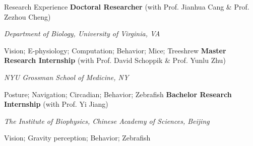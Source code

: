 \begin{rubric}{Research Experience}
\entry*[2025 - Present]%
    \textbf{Doctoral Researcher} (with Prof. Jianhua Cang \& Prof. Zezhou Cheng)\par
    \textit{Department of Biology, University of Virginia, VA}\par
    \textcolor{SwishLineColour}{Vision; E-physiology; Computation; Behavior; Mice; Treeshrew}
%
\entry*[2023 - 2025]%
    \textbf{Master Research Internship} (with Prof. David Schoppik \& Prof. Yunlu Zhu)\par
    \textit{NYU Grossman School of Medicine, NY}\par
    \textcolor{SwishLineColour}{Posture; Navigation; Circadian; Behavior; Zebrafish}
%
\entry*[2019 - 2020]%
    \textbf{Bachelor Research Internship} (with Prof. Yi Jiang)\par
    \textit{The Institute of Biophysics, Chinese Academy of Sciences, Beijing}\par
    \textcolor{SwishLineColour}{Vision; Gravity perception; Behavior; Zebrafish}
%
\end{rubric}

